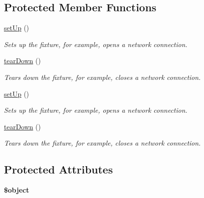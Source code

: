 \subsection*{Protected Member Functions}
\begin{DoxyCompactItemize}
\item 
\hyperlink{class_controller_test_abf34eee2a82ff6899c68e6e224b5c90d}{setUp} ()
\begin{DoxyCompactList}\small\item\em Sets up the fixture, for example, opens a network connection. \item\end{DoxyCompactList}\item 
\hyperlink{class_controller_test_ad5e25898afe5d0e97381218c202afdcc}{tearDown} ()
\begin{DoxyCompactList}\small\item\em Tears down the fixture, for example, closes a network connection. \item\end{DoxyCompactList}\item 
\hyperlink{class_controller_test_abf34eee2a82ff6899c68e6e224b5c90d}{setUp} ()
\begin{DoxyCompactList}\small\item\em Sets up the fixture, for example, opens a network connection. \item\end{DoxyCompactList}\item 
\hyperlink{class_controller_test_ad5e25898afe5d0e97381218c202afdcc}{tearDown} ()
\begin{DoxyCompactList}\small\item\em Tears down the fixture, for example, closes a network connection. \item\end{DoxyCompactList}\end{DoxyCompactItemize}
\subsection*{Protected Attributes}
\begin{DoxyCompactItemize}
\item 
\hypertarget{class_controller_test_a0f9d9f4d8285e8079e0449d8b7251ba2}{
{\bfseries \$object}}
\label{class_controller_test_a0f9d9f4d8285e8079e0449d8b7251ba2}

\end{DoxyCompactItemize}


